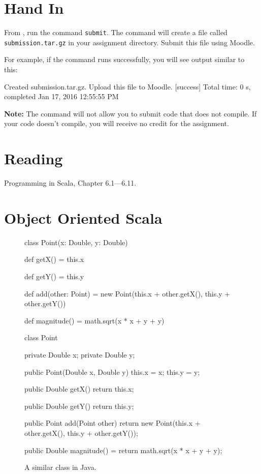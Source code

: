 \documentclass{book}
\begin{document}
\section{Hand In}

From \sbt{}, run the command \verb|submit|. The command will create
a file called \verb|submission.tar.gz| in your assignment directory.
Submit this file using Moodle.

For example, if the command runs successfully, you will see output similar
to this:
%
\begin{console}
Created submission.tar.gz. Upload this file to Moodle.
[success] Total time: 0 s, completed Jan 17, 2016 12:55:55 PM
\end{console}

\textbf{Note:}  The command will not allow you to submit code that does not
compile. If your code doesn't compile, you will receive no credit for the
assignment.

\newlecture

\section{Reading}

Programming in Scala, Chapter 6.1---6.11.

\section{Object Oriented Scala}

\begin{figure}
\begin{minipage}{0.45\textwidth}
\begin{scalacode}
class Point(x: Double, y: Double) {

  def getX() = this.x

  def getY() = this.y

  def add(other: Point) = {
    new Point(this.x + other.getX(),
              this.y + other.getY())
  }

  def magnitude() = math.sqrt(x * x + y + y)
}
\end{scalacode}
\caption{A class for points.}\label{pointclass}
\end{minipage}
\quad\vrule\quad
\begin{minipage}{0.45\textwidth}
\begin{javacode}
class Point {
  private Double x;
  private Double y;

  public Point(Double x, Double y) {
    this.x = x;
    this.y = y;
  }

  public Double getX() {
    return this.x;
  }

  public Double getY() {
    return this.y;
  }

  public Point add(Point other) {
    return new Point(this.x + other.getX(),
                     this.y + other.getY());
  }

  public Double magnitude() = {
    return math.sqrt(x * x + y + y);
  }
}
\end{javacode}
\caption{A similar class in Java.}
\end{minipage}
\end{figure}
\end{document}
